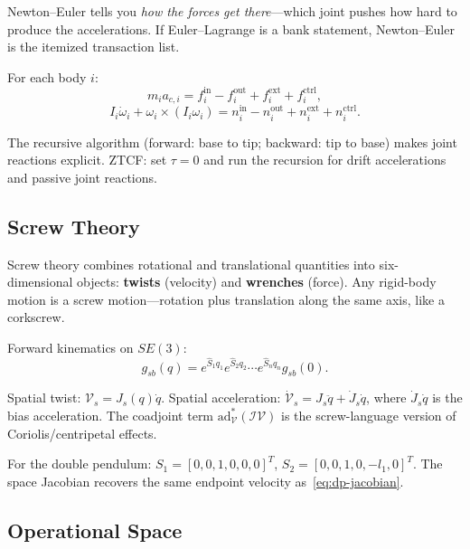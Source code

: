 \documentclass[11pt]{article}
\begin{document}
Newton--Euler tells you \emph{how the forces get there}---which joint pushes how hard to produce the accelerations. If Euler--Lagrange is a bank statement, Newton--Euler is the itemized transaction list.

For each body $i$:
\begin{equation}\label{eq:ne-trans}
m_i a_{c,i} = f_i^{\mathrm{in}} - f_i^{\mathrm{out}} + f_i^{\mathrm{ext}} + f_i^{\mathrm{ctrl}},
\end{equation}
\begin{equation}\label{eq:ne-rot}
I_i\dot\omega_i + \omega_i\times(I_i\omega_i) = n_i^{\mathrm{in}} - n_i^{\mathrm{out}} + n_i^{\mathrm{ext}} + n_i^{\mathrm{ctrl}}.
\end{equation}

The recursive algorithm (forward: base to tip; backward: tip to base) makes joint reactions explicit. ZTCF: set $\tau=0$ and run the recursion for drift accelerations and passive joint reactions.

\subsection{Screw Theory}\label{sec:poe-screw}

Screw theory combines rotational and translational quantities into six-dimensional objects: \textbf{twists} (velocity) and \textbf{wrenches} (force). Any rigid-body motion is a screw motion---rotation plus translation along the same axis, like a corkscrew.

Forward kinematics on $SE(3)$:
\begin{equation}\label{eq:poe-fk}
g_{sb}(q) = e^{\hat{S}_1 q_1}e^{\hat{S}_2 q_2}\cdots e^{\hat{S}_n q_n}g_{sb}(0).
\end{equation}

Spatial twist: $\mathcal{V}_s = J_s(q)\dot{q}$. Spatial acceleration: $\dot{\mathcal{V}}_s = J_s\ddot{q} + \dot{J}_s\dot{q}$, where $\dot{J}_s\dot{q}$ is the bias acceleration. The coadjoint term $\mathrm{ad}_{\mathcal{V}}^{*}(\mathcal{I}\mathcal{V})$ is the screw-language version of Coriolis/centripetal effects.

For the double pendulum: $S_1 = [0,0,1,0,0,0]^T$, $S_2 = [0,0,1,0,-l_1,0]^T$. The space Jacobian recovers the same endpoint velocity as~\eqref{eq:dp-jacobian}.

\subsection{Operational Space}\label{sec:operational-space}
\end{document}
